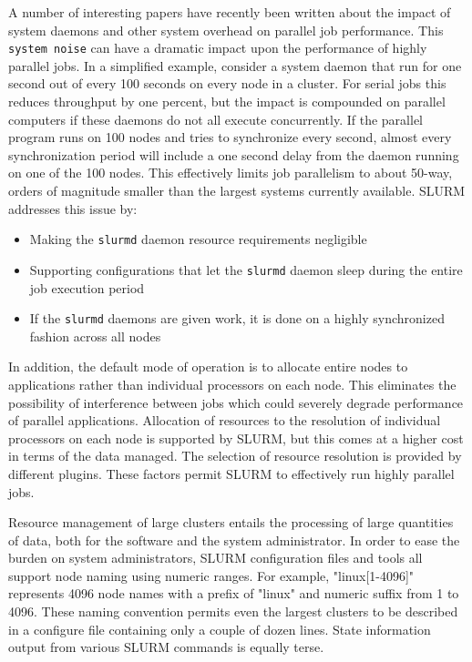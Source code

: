 \documentclass[10pt,onecolumn,times]{../common/llncs}
\begin{document}
{A number of interesting papers 
\cite{Jones2003,Kerbyson2001 Petrini2003,Phillips2003,Tsafrir2005}
have recently been written about
the impact of system daemons and other system overhead on 
parallel job performance. This {\tt system noise} can have a 
dramatic impact upon the performance of highly parallel jobs. 
In a simplified example, consider a system daemon that run for 
one second out of every 100 seconds on every node in a cluster. 
For serial jobs this 
reduces throughput by one percent, but the impact is compounded 
on parallel computers if these daemons do not all execute concurrently. 
If the parallel program runs on 100 nodes and tries to synchronize 
every second, almost every synchronization period will include a
one second delay from the daemon running on one of the 100 nodes. 
This effectively limits job parallelism to about 50-way, orders 
of magnitude smaller than the largest systems currently available.
SLURM addresses this issue by:
\begin{itemize}
\item Making the {\tt slurmd} daemon resource requirements negligible 
\item Supporting configurations that let the {\tt slurmd} daemon sleep 
during the entire job execution period
\item If the {\tt slurmd} daemons are given work, it is done on a 
highly synchronized fashion across all nodes
\end{itemize}
In addition, the default mode of operation is to allocate entire 
nodes to applications rather than individual processors on each node. 
This eliminates the possibility of interference between jobs 
which could severely degrade performance of parallel applications.
Allocation of resources to the resolution of individual processors 
on each node is supported by SLURM, but this comes at a higher cost 
in terms of the data managed.
The selection of resource resolution is provided by different plugins.
These factors permit SLURM to effectively run highly parallel jobs.

Resource management of large clusters entails the processing of 
large quantities of data, both for the software and the 
system administrator.
In order to ease the burden on system administrators, SLURM 
configuration files and tools all support node naming using
numeric ranges.
For example, "linux[1-4096]" represents 4096 node names with 
a prefix of "linux" and numeric suffix from 1 to 4096. 
These naming convention permits even the largest clusters 
to be described in a configure file containing only a 
couple of dozen lines. 
State information output from various SLURM commands is 
equally terse.

}
\end{document}
